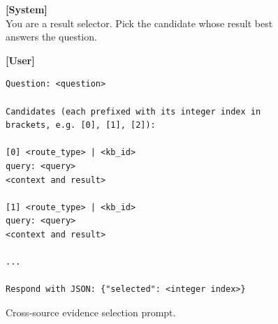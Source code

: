 \begin{figure}
\centering
\begin{promptbox}
\textbf{[System]}\\[2pt]
You are a result selector. Pick the candidate whose result best answers the question.

\tcbline

\textbf{[User]}\\[2pt]
\begin{verbatim}
Question: <question>

Candidates (each prefixed with its integer index in brackets, e.g. [0], [1], [2]):

[0] <route_type> | <kb_id>
query: <query>
<context and result>

[1] <route_type> | <kb_id>
query: <query>
<context and result>

...

Respond with JSON: {"selected": <integer index>}
\end{verbatim}
\end{promptbox}
\caption{Cross-source evidence selection prompt.}
\label{fig:evidence_selection_prompt}
\end{figure}
